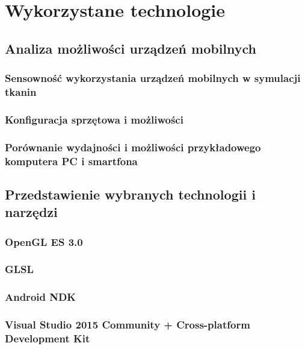 \chapter{Wykorzystane technologie}
\label{t:technologie}


	\section{Analiza możliwości urządzeń mobilnych}
	\label{t:technologie:mobilne}
	
		\subsection{Sensowność wykorzystania urządzeń mobilnych w symulacji tkanin}
		\label{t:technologie:mobilne:dlaczego}
	
		\subsection{Konfiguracja sprzętowa i możliwości}
		\label{t:technologie:mobilne:konfiguracja}
		
		\subsection{Porównanie wydajności i możliwości przykładowego komputera PC i smartfona}
		\label{t:technologie:mobilne:porownanie}

	
	\section{Przedstawienie wybranych technologii i narzędzi}
	\label{t:technologie:narzedzia}
	
		\subsection{OpenGL ES 3.0}
		\label{t:technologie:mobilne:ogl}
		
		\subsection{GLSL}
		\label{t:technologie:mobilne:glsl}
		
		\subsection{Android NDK}
		\label{t:technologie:mobilne:ndk}
		
		\subsection{Visual Studio 2015 Community + Cross-platform Development Kit}
		\label{t:technologie:mobilne:vs}